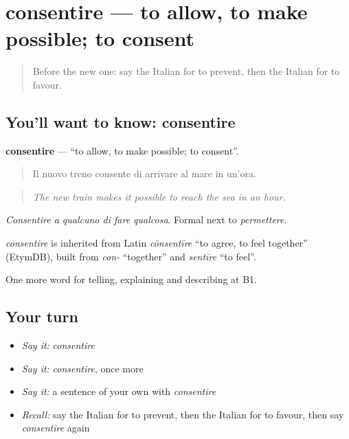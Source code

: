 \section[consentire]{consentire — to allow, to make possible; to consent}

\label{lesson:IT-C354-consentire}



\begin{quote}
Before the new one: say the Italian for to prevent, then the Italian for to favour.
\end{quote}

\subsection*{You'll want to know: consentire}
\textbf{consentire} — \textquotedblleft{}to allow, to make possible; to consent\textquotedblright{}.

\begin{quote}
Il nuovo treno consente di arrivare al mare in un'ora.
\end{quote}

\begin{quote}
\emph{The new train makes it possible to reach the sea in an hour.}
\end{quote}

\emph{Consentire a qualcuno di fare qualcosa}. Formal next to \emph{permettere}.

\begin{cousinweb}
\emph{consentire} is inherited from Latin \emph{cōnsentīre} \textquotedblleft{}to agree, to feel together\textquotedblright{} (EtymDB), built from \emph{con-} \textquotedblleft{}together\textquotedblright{} and \emph{sentīre} \textquotedblleft{}to feel\textquotedblright{}.
\end{cousinweb}

\begin{grammarlens}[title={What you've built}]
One more word for telling, explaining and describing at B1.
\end{grammarlens}

\subsection*{Your turn}
\begin{itemize}
\raggedright
  \item \emph{Say it:} \emph{consentire}
  \item \emph{Say it:} \emph{consentire}, once more
  \item \emph{Say it:} a sentence of your own with \emph{consentire}
  \item \emph{Recall:} say the Italian for to prevent, then the Italian for to favour, then say \emph{consentire} again
\end{itemize}

